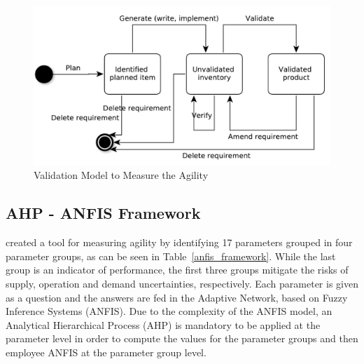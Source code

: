 \begin{figure} [H]
\centerline{\includegraphics[scale=0.6]{include/relatedwork/fig/validation_model.pdf}}
\caption{Validation Model to Measure the Agility} 
\label{validation_model}
\end{figure}

\subsection{AHP - ANFIS Framework} %
\citet{poonacha} created a tool for measuring agility by identifying 17 parameters grouped in four parameter groups, as can be seen in Table~\ref{anfis_framework}. While the last group is an indicator of performance, the first three groups mitigate the risks of supply, operation and demand uncertainties, respectively. Each parameter is given as a question and the answers are fed in the Adaptive Network, based on Fuzzy Inference Systems (ANFIS). Due to the complexity of the ANFIS model, an Analytical Hierarchical Process (AHP) is mandatory to be applied at the parameter level in order to compute the values for the parameter groups and then employee ANFIS at the parameter group level.

